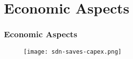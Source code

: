 \section{Economic Aspects}

\begin{frame}[allowframebreaks]
\frametitle{Economic Aspects}

\begin{center}
  \begin{figure}
    \texttt{[image: sdn-saves-capex.png]}
  \end{figure}
\end{center}

\end{frame}
